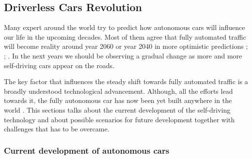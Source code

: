 \documentclass[11pt,english]{article}
\begin{document}


\subsection{Driverless Cars Revolution}

Many expert around the world try to predict how autonomous cars will influence our life in the upcoming decades. Most of them agree that fully automated traffic will become reality around year 2060 or year 2040 in more optimistic predictions \citep{kitti2012we}; \citep{litman2014autonomous}; \citep{sivak2015road}. In the next years we should be observing a gradual change as more and more self-driving cars appear on the roads. 
\par
The key factor that influences the steady shift towards fully automated traffic is a broadly understood technological advancement. Although, all the efforts lead towards it, the fully autonomous car has now been yet built anywhere in the world \citep{litman2014autonomous}. 
This sections talks about the current development of the self-driving  technology and about possible scenarios for future development together with challenges that has to be overcame.








\subsubsection{Current development of autonomous cars}
\end{document}
